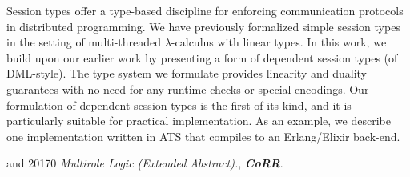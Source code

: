 \documentclass[bsl,meeting,bibalpha]{asl}
\newcommand{\NP}{}
\begin{document}
\thispagestyle{empty}



\NP  
{}



Session types offer a type-based discipline for enforcing communication
protocols in distributed programming. We have previously formalized
simple session types in the setting of multi-threaded
\(\lambda\)-calculus with linear types. In this work, we build upon our
earlier work by presenting a form of dependent session types (of
DML-style). The type system we formulate provides linearity and duality
guarantees with no need for any runtime checks or special encodings. Our
formulation of dependent session types is the first of its kind, and it
is particularly suitable for practical implementation. As an example, we
describe one implementation written in ATS that compiles to an
Erlang/Elixir back-end. \cite{Xi:2017wv}





\begin{thebibliography}{9}

{ and }
{2017}{}{0}
{}{}
  {\em {Multirole Logic
  (Extended Abstract).}}, {\bfseries\itshape CoRR}.

\end{thebibliography}


\vspace*{-0.5\baselineskip}


\end{document}
